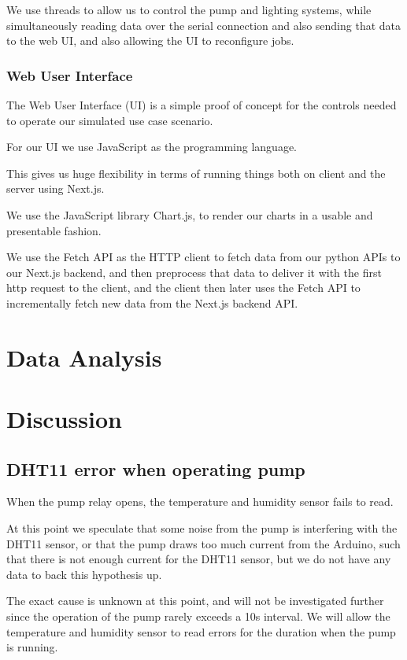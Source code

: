 \documentclass[a4paper,12pt,twoside,openright,titlepage]{book}
\begin{document}
We use threads to allow us to control the pump and lighting systems, while simultaneously reading data over the serial connection and also sending that data to the web UI, and also allowing the UI to reconfigure jobs.

\subsection{Web User Interface}
The Web User Interface (UI) is a simple proof of concept for the controls needed to operate our simulated use case scenario.

For our UI we use JavaScript as the programming language.

This gives us huge flexibility in terms of running things both on client and the server using Next.js.

We use the JavaScript library Chart.js, to render our charts in a usable and presentable fashion.

We use the Fetch API as the HTTP client to fetch data from our python APIs to our Next.js backend, and then preprocess that data to deliver it with the first http request to the client, and the client then later uses the Fetch API to incrementally fetch new data from the Next.js backend API.

\chapter{Data Analysis}

\chapter{Discussion}


\section{DHT11 error when operating pump}
When the pump relay opens, the temperature and humidity sensor fails to read.

At this point we speculate that some noise from the pump is interfering with the DHT11 sensor, or that the pump draws too much current from the Arduino, such that there is not enough current for the DHT11 sensor, but we do not have any data to back this hypothesis up.

The exact cause is unknown at this point, and will not be investigated further since the operation of the pump rarely exceeds a 10s interval. We will allow the temperature and humidity sensor to read errors for the duration when the pump is running.
\end{document}
